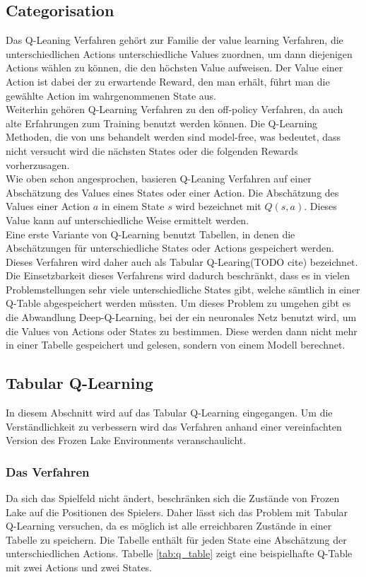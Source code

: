 \documentclass[11pt]{scrartcl}
\begin{document}
\subsection{Categorisation}
Das Q-Leaning Verfahren gehört zur Familie der value learning Verfahren, die
unterschiedlichen Actions unterschiedliche Values zuordnen, um dann diejenigen Actions
wählen zu können, die den höchsten Value aufweisen. Der Value einer Action ist dabei der
zu erwartende Reward, den man erhält, führt man die gewählte Action im wahrgenommenen
State aus.\\
Weiterhin gehören Q-Learning Verfahren zu den off-policy Verfahren, da auch alte
Erfahrungen zum Training benutzt werden können. Die Q-Learning Methoden, die von uns
behandelt werden sind model-free, was bedeutet, dass nicht versucht wird die nächsten
States oder die folgenden Rewards vorherzusagen.\\
Wie oben schon angesprochen, basieren Q-Leaning Verfahren auf einer Abschätzung des Values
eines States oder einer Action. Die Abschätzung des Values einer Action $a$ in einem State
$s$ wird bezeichnet mit $Q(s, a)$. Dieses Value kann auf unterschiedliche Weise ermittelt
werden.\\
Eine erste Variante von Q-Learning benutzt Tabellen, in denen die Abschätzungen
für unterschiedliche States oder Actions gespeichert werden. Dieses Verfahren wird daher
auch als \grqq Tabular Q-Learing\grqq (TODO cite) bezeichnet. Die Einsetzbarkeit dieses
Verfahrens wird dadurch beschränkt, dass es in vielen Problemstellungen sehr viele
unterschiedliche States gibt, welche sämtlich in einer Q-Table abgespeichert werden
müssten. Um dieses Problem zu umgehen gibt es die Abwandlung \grqq Deep-Q-Learning\grqq,
bei der ein neuronales Netz benutzt wird, um die Values von Actions oder States zu
bestimmen. Diese werden dann nicht mehr in einer Tabelle gespeichert und gelesen, sondern
von einem Modell berechnet.

\subsection{Tabular Q-Learning}
In diesem Abschnitt wird auf das Tabular Q-Learning eingegangen. Um die
Ver\-ständ\-lich\-keit zu verbessern wird das Verfahren anhand einer vereinfachten Version
des Frozen Lake Environments veranschaulicht.

\subsubsection{Das Verfahren}
Da sich das Spielfeld nicht ändert, beschränken sich die Zustände von Frozen Lake auf die
Positionen des Spielers. Daher lässt sich das Problem mit Tabular Q-Learning versuchen, da
es möglich ist alle erreichbaren Zustände in einer Tabelle zu speichern. Die Tabelle
enthält für jeden State eine Abschätzung der unterschiedlichen Actions. Tabelle
\ref{tab:q_table} zeigt eine beispielhafte Q-Table mit zwei Actions und zwei States.
\end{document}
